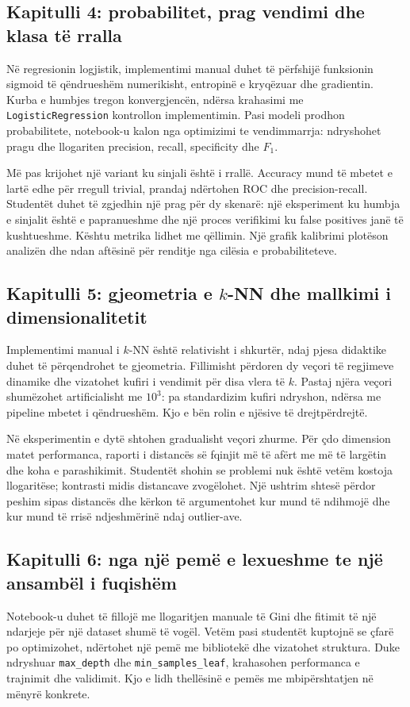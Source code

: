\documentclass[12pt,a4paper,oneside]{book}
\begin{document}
\subsection*{Kapitulli 4: probabilitet, prag vendimi dhe klasa të rralla}
Në regresionin logjistik, implementimi manual duhet të përfshijë funksionin sigmoid të qëndrueshëm numerikisht, entropinë e kryqëzuar dhe gradientin. Kurba e humbjes tregon konvergjencën, ndërsa krahasimi me \texttt{LogisticRegression} kontrollon implementimin. Pasi modeli prodhon probabilitete, notebook-u kalon nga optimizimi te vendimmarrja: ndryshohet pragu dhe llogariten precision, recall, specificity dhe $F_1$.

Më pas krijohet një variant ku sinjali është i rrallë. Accuracy mund të mbetet e lartë edhe për rregull trivial, prandaj ndërtohen ROC dhe precision-recall. Studentët duhet të zgjedhin një prag për dy skenarë: një eksperiment ku humbja e sinjalit është e papranueshme dhe një proces verifikimi ku false positives janë të kushtueshme. Kështu metrika lidhet me qëllimin. Një grafik kalibrimi plotëson analizën dhe ndan aftësinë për renditje nga cilësia e probabiliteteve.

\subsection*{Kapitulli 5: gjeometria e $k$-NN dhe mallkimi i dimensionalitetit}
Implementimi manual i $k$-NN është relativisht i shkurtër, ndaj pjesa didaktike duhet të përqendrohet te gjeometria. Fillimisht përdoren dy veçori të regjimeve dinamike dhe vizatohet kufiri i vendimit për disa vlera të $k$. Pastaj njëra veçori shumëzohet artificialisht me $10^3$: pa standardizim kufiri ndryshon, ndërsa me pipeline mbetet i qëndrueshëm. Kjo e bën rolin e njësive të drejtpërdrejtë.

Në eksperimentin e dytë shtohen gradualisht veçori zhurme. Për çdo dimension matet performanca, raporti i distancës së fqinjit më të afërt me më të largëtin dhe koha e parashikimit. Studentët shohin se problemi nuk është vetëm kostoja llogaritëse; kontrasti midis distancave zvogëlohet. Një ushtrim shtesë përdor peshim sipas distancës dhe kërkon të argumentohet kur mund të ndihmojë dhe kur mund të rrisë ndjeshmërinë ndaj outlier-ave.

\subsection*{Kapitulli 6: nga një pemë e lexueshme te një ansambël i fuqishëm}
Notebook-u duhet të fillojë me llogaritjen manuale të Gini dhe fitimit të një ndarjeje për një dataset shumë të vogël. Vetëm pasi studentët kuptojnë se çfarë po optimizohet, ndërtohet një pemë me bibliotekë dhe vizatohet struktura. Duke ndryshuar \texttt{max\_depth} dhe \texttt{min\_samples\_leaf}, krahasohen performanca e trajnimit dhe validimit. Kjo e lidh thellësinë e pemës me mbipërshtatjen në mënyrë konkrete.
\end{document}
